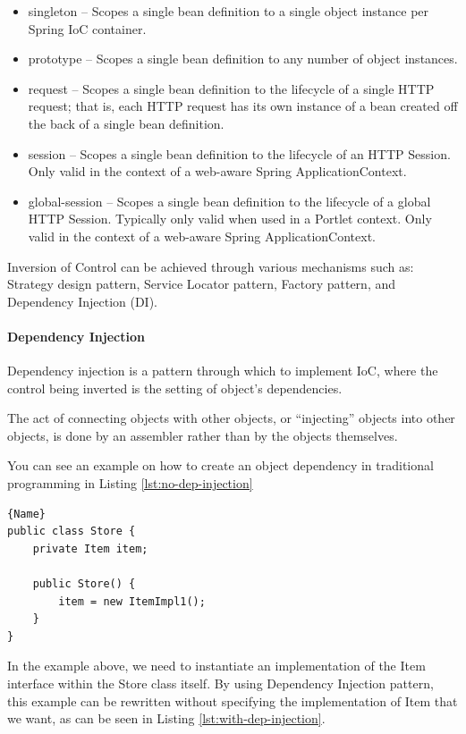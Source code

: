 \documentclass[thesis=M,english,hidelinks]{FITthesis}[2019/12/23]
\begin{document}
\begin{itemize}
	\item singleton – Scopes a single bean definition to a single object instance per Spring IoC container.
	\item prototype –	Scopes a single bean definition to any number of object instances.
	\item request – Scopes a single bean definition to the lifecycle of a single HTTP request; that is, each HTTP request has its own instance of a bean created off the back of a single bean definition. 
	\item session – Scopes a single bean definition to the lifecycle of an HTTP Session. Only valid in the context of a web-aware Spring ApplicationContext.
	\item global-session – 	Scopes a single bean definition to the lifecycle of a global HTTP Session. Typically only valid when used in a Portlet context. Only valid in the context of a web-aware Spring ApplicationContext.
\end{itemize}

Inversion of Control can be achieved through various mechanisms such as: Strategy design pattern, Service Locator pattern, Factory pattern, and Dependency Injection (DI).

\paragraph{Dependency Injection}

Dependency injection is a pattern through which to implement IoC, where the control being inverted is the setting of object's dependencies.

The act of connecting objects with other objects, or “injecting” objects into other objects, is done by an assembler rather than by the objects themselves.

You can see an example on how to create an object dependency in traditional programming in Listing \ref{lst:no-dep-injection}


\begin{lstlisting}[caption=Example class without a Dependency Injection,frame=tlrb,  label = {lst:no-dep-injection}]{Name}
public class Store {
	private Item item;

	public Store() {
		item = new ItemImpl1();    
	}
}
\end{lstlisting}

In the example above, we need to instantiate an implementation of the Item interface within the Store class itself. By using Dependency Injection pattern, this example can be rewritten without specifying the implementation of Item that we want, as can be seen in Listing \ref{lst:with-dep-injection}.
\end{document}
